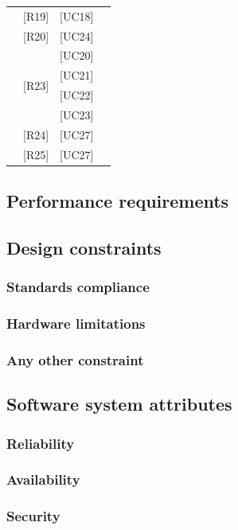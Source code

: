 \documentclass[12pt]{article}
\begin{document}
\begin{longtable}{| c | c | c | c |}
    				           & [R19] & [UC18] & \\ \cline{2-4}
    				           & [R20] & [UC24] & \\ \cline{2-4}
    				           & \multirow{4}{*}{[R23]} & [UC20] & \\ \cline{3-4}
    				           &                        & [UC21] & \\ \cline{3-4}
    				           &                        & [UC22] & \\ \cline{3-4}
    				           &                        & [UC23] & \\ \cline{2-4}
    				           & [R24] & [UC27] & \\ \cline{2-4}
    				           & [R25] & [UC27] & \\
    \hline
\end{longtable}

\subsection{Performance requirements}

\subsection{Design constraints}
\subsubsection{Standards compliance}
\subsubsection{Hardware limitations}
\subsubsection{Any other constraint}

\subsection{Software system attributes}
\subsubsection{Reliability}
\subsubsection{Availability}
\subsubsection{Security}
\end{document}
